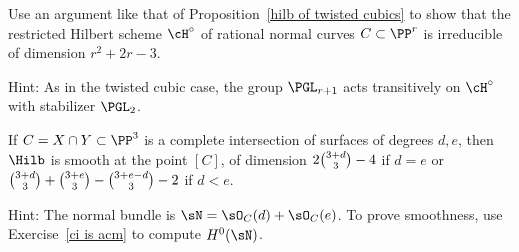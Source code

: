 \begin{exercise}
\label{rational normal hilbert}
Use an  argument like that of Proposition~\ref{hilb of twisted cubics}
to show that the restricted Hilbert scheme $\cH^\circ$ of rational normal
%
curves $C \subset \PP^r$ is irreducible of dimension $r^2+2r-3$.

Hint: As in the twisted cubic case, the group
$\PGL_{r+1}$
%
acts
transitively on $\cH^\circ$ with stabilizer $\PGL_2$.
\end{exercise}

\begin{exercise}
\label{hilb at a ci}
If $C = X\cap Y\subset \PP^3$ is a
%
complete intersection
 of surfaces of
degrees $d,e$, then
$\Hilb$ is smooth at the point $[C]$, of dimension $2\tbinom{3+d}{3}-4$
if $d=e$
or $\tbinom{3+d}{3} +\tbinom{3+e}{3} -\tbinom{3+e-d}{3} -2$ if $d<e$.

Hint: The normal bundle is $\sN = \sO_C(d)+\sO_C(e)$. To prove smoothness,
use
Exercise~\ref{ci is acm} to compute $H^0(\sN)$.
\end{exercise}


